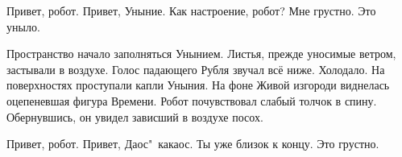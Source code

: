 \begin{dialog}
\X Привет, робот.
\R Привет, Уныние.
\X Как настроение, робот?
\R Мне грустно.
\X Это уныло.
\end{dialog}

\begin{monolog}
Пространство начало заполняться Унынием. Листья, прежде уносимые ветром, застывали в воздухе. Голос падающего Рубля звучал всё ниже. Холодало. На поверхностях проступали капли Уныния. На фоне Живой изгороди виднелась оцепеневшая фигура Времени. Робот почувствовал слабый толчок в спину. Обернувшись, он увидел зависший в воздухе посох.
\end{monolog}

\begin{dialog}
\Y Привет, робот.
\R Привет, Даос"~какаос.
\Y Ты уже близок к концу.
\R Это грустно.
\end{dialog}